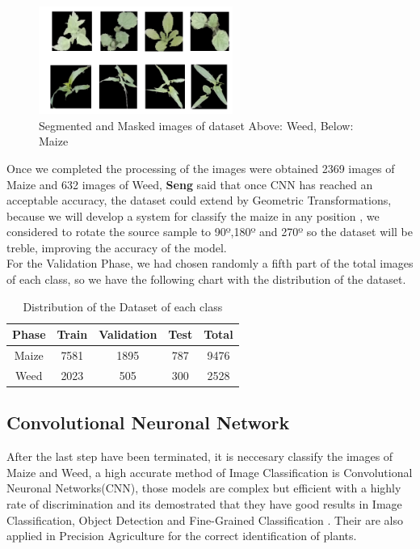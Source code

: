 \documentclass[conference]{IEEEtran}
\begin{document}
	\begin{figure}[h]
	\centering
	\includegraphics[width=2.5in]{im1}
	\caption{ Segmented and Masked images of dataset Above: Weed, Below: Maize}
	\label{fig_sim}
	\end{figure}
	
Once we completed the processing of the images were obtained 2369 images of Maize and 632 images of Weed, \textbf{Seng} \cite{SengChang} said that once CNN has reached an acceptable accuracy, the dataset could extend by Geometric Transformations, because we will develop a  system  for classify the maize in any position , we considered to rotate the source sample to 90º,180º and 270º so the dataset will be treble, improving the accuracy of the model. \\

For the Validation Phase, we had chosen randomly a fifth part of the total images of each class, so we have the following chart with the distribution of the dataset.

\begin{table}[h!]
\centering
\begin{tabular}{||c c c c c||} 
 \hline
 Phase & Train & Validation & Test & Total \\ [0.5ex] 
 \hline\hline
 Maize & 7581 & 1895 & 787 & 9476 \\ 
 Weed & 2023 & 505 & 300 & 2528\\[1ex] 
 \hline
\end{tabular}
\caption{Distribution of the Dataset of each class}
\label{table:1}
\end{table}
	
	
\subsection{Convolutional Neuronal Network}
	After the last step have been terminated, it is neccesary classify the images of Maize and Weed, a high accurate method of Image Classification is Convolutional Neuronal Networks(CNN), those models are complex but efficient with a highly rate of discrimination and its demostrated that they have good results in Image Classification, Object Detection and Fine-Grained  Classification \cite{Razavian}. Their are also applied in Precision Agriculture \cite{Potena:Nardi} for the correct identification of plants.
\\ 
\end{document}
